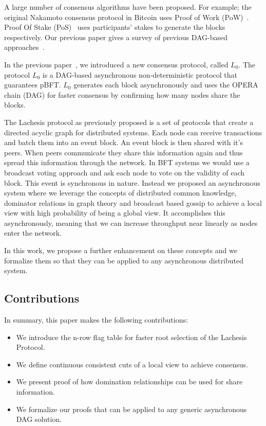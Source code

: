 \documentclass{article}
\begin{document}
A large number of consensus algorithms have been proposed. For example; 
the original Nakamoto consensus protocol in Bitcoin uses Proof of Work (PoW)~\cite{bitcoin08}. Proof Of Stake (PoS)~\cite{ppcoin12,dpos14} uses participants' stakes to generate the blocks respectively. Our previous paper gives a survey of previous DAG-based approaches~\cite{lachesis01}.

In the previous paper~\cite{lachesis01},  we introduced a new consensus protocol, called $L_0$. The protocol $L_0$ is a DAG-based asynchronous non-deterministic protocol that guarantees pBFT.
$L_0$ generates each block asynchronously and uses the OPERA chain (DAG) for faster consensus by confirming how many nodes share the blocks.

The Lachesis protocol as previously proposed is a set of protocols that create a directed acyclic graph for distributed systems. Each node can receive transactions and batch them into an event block. An event block is then shared with it's peers. When peers communicate they share this information again and thus spread this information through the network. In BFT systems we would use a broadcast voting approach and ask each node to vote on the validity of each block. This event is synchronous in nature. Instead we proposed an asynchronous system where we leverage the concepts of distributed common knowledge, dominator relations in graph theory and broadcast based gossip to achieve a local view with high probability of being a global view. It accomplishes this asynchronously, meaning that we can increase throughput near linearly as nodes enter the network.

In this work, we propose a further enhancement on these concepts and we formalize them so that they can be applied to any asynchronous distributed system.

\subsection{Contributions}

In summary, this paper makes the following contributions:
\begin{itemize}
\item We introduce the n-row flag table for faster root selection of the Lachesis Protocol.
\item We define continuous consistent cuts of a local view to achieve consensus.
\item We present proof of how domination relationships can be used for share information.
\item We formalize our proofs that can be applied to any generic asynchronous DAG solution.
\end{itemize}
\end{document}
